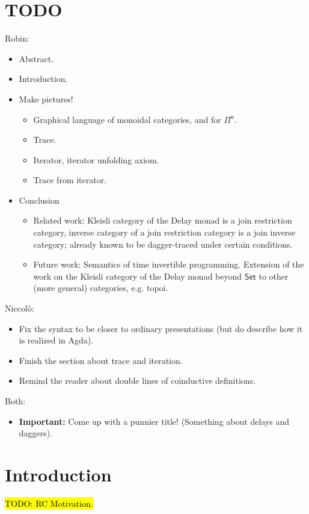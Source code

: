 \documentclass[runningheads]{llncs}
\newcommand{\Pio}{$\mathsf{\Pi}^{\mathsf{o}}$}
\newcommand{\Set}{\mathsf{Set}}
\newcommand{\todo}[1]{\hl{TODO: #1}}
\begin{document}
\section{TODO} %
\label{sec:todo}
Robin:
\begin{itemize}
  \item Abstract.
  \item Introduction.
  \item Make pictures! 
  \begin{itemize}
    \item Graphical language of monoidal categories, and for \Pio.
    \item Trace.  
    \item Iterator, iterator unfolding axiom.
    \item Trace from iterator.
  \end{itemize}
  \item Conclusion
  \begin{itemize}
    \item Related work: Kleisli category of the Delay monad is a join
    restriction category, inverse category of a join restriction category is a
    join inverse category; already known to be dagger-traced under certain
    conditions.
    \item Future work: Semantics of time invertible programming. Extension of
    the work on the Kleisli category of the Delay monad beyond $\Set$ to other
    (more general) categories, e.g. topoi.
  \end{itemize}
\end{itemize}
Niccolò: 
\begin{itemize}
  \item Fix the syntax to be closer to ordinary presentations (but do describe 
  how it is realized in Agda).
  \item Finish the section about trace and iteration.
  \item Remind the reader about double lines of coinductive definitions. 
\end{itemize}
Both:
\begin{itemize}
  \item \textbf{Important:} Come up with a punnier title! (Something about 
  delays and daggers).
\end{itemize}

\section{Introduction}\label{sec:intro}
\todo{RC Motivation.}
\end{document}
